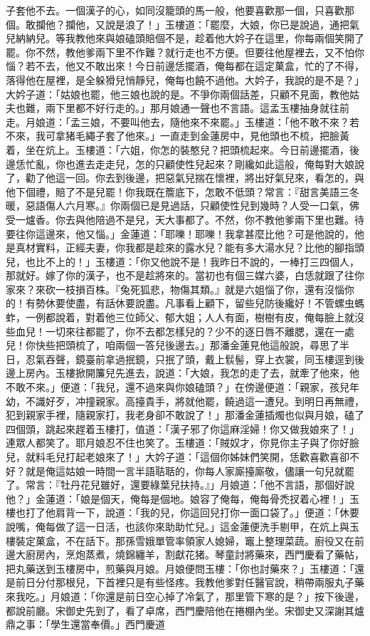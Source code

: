 \begin{showcontents}{}
子套他不去。一個漢子的心，如同沒籠頭的馬一般，他要喜歡那一個，只喜歡那個。敢攔他？攔他，又說是浪了！」玉樓道：「罷麼，大娘，你已是說過，通把氣兒納納兒。等我教他來與娘磕頭賠個不是，趁着他大妗子在這里，你每兩個笑開了罷。你不然，教他爹兩下里不作難？就行走也不方便。但要往他屋裡去，又不怕你惱？若不去，他又不敢出來！今日前邊恁擺酒，俺每都在這定菓盒，忙的了不得，落得他在屋裡，是全躲猾兒悄靜兒，俺每也饒不過他。大妗子，我說的是不是？」大妗子道：「姑娘也罷，他三娘也說的是。不爭你兩個話差，只顧不見面，教他姑夫也難，兩下里都不好行走的。」那月娘通一聲也不言語。這孟玉樓抽身就往前走。月娘道：「孟三娘，不要叫他去，隨他來不來罷。」玉樓道：「他不敢不來？若不來，我可拿猪毛繩子套了他來。」一直走到金蓮房中，見他頭也不梳，把臉黃着，坐在炕上。玉樓道：「六姐，你怎的裝憨兒？把頭梳起來。今日前邊擺酒，後邊恁忙亂，你也進去走走兒，怎的只顧使性兒起來？剛纔如此這般，俺每對大娘說了，勸了他這一回。你去到後邊，把惡氣兒揣在懷裡，將出好氣兒來，看怎的，與他下個禮，賠了不是兒罷！你我既在簷底下，怎敢不低頭？常言：『甜言美語三冬暖，惡語傷人六月寒。』你兩個已是見過話，只顧使性兒到幾時？人受一口氣，佛受一爐香。你去與他陪過不是兒，天大事都了。不然，你不教他爹兩下里也難。待要往你這邊來，他又惱。」金蓮道：「耶嚛！耶嚛！我拿甚麼比他？可是他說的，他是真材實料，正經夫妻，你我都是趁來的露水兒？能有多大湯水兒？比他的腳指頭兒，也比不上的！」玉樓道：「你又他說不是！我昨日不說的，一棒打三四個人，那就好。嫁了你的漢子，也不是趁將來的。當初也有個三媒六婆，白恁就跟了往你家來？來砍一枝損百株。『兔死狐悲，物傷其類。』就是六姐惱了你，還有沒惱你的！有勢休要使盡，有話休要說盡。凡事看上顧下，留些兒防後纔好！不管螺虫螞蚱，一例都說着，對着他三位師父、郁大姐；人人有面，樹樹有皮，俺每臉上就沒些血兒！一切來往都罷了，你不去都怎樣兒的？少不的逐日唇不離腮，還在一處兒！你快些把頭梳了，咱兩個一答兒後邊去。」那潘金蓮見他這般說，尋思了半日，忍氣吞聲，鏡臺前拿過抿鏡，只抿了頭，戴上䯼髻，穿上衣裳，同玉樓逕到後邊上房內。玉樓掀開簾兒先進去，說道：「大娘，我怎的走了去，就牽了他來，他不敢不來。」便道：「我兒，還不過來與你娘磕頭？」在傍邊便道：「親家，孩兒年幼，不識好歹，冲撞親家。高擡貴手，將就他罷，饒過這一遭兒。到明日再無禮，犯到親家手裡，隨親家打，我老身卻不敢說了！」那潘金蓮插燭也似與月娘，磕了四個頭，跳起來趕着玉樓打，值道：「漢子邪了你這麻淫婦！你又做我娘來了！」連眾人都笑了。耶月娘忍不住也笑了。玉樓道：「賊奴才，你見你主子與了你好臉兒，就料毛兒打起老娘來了！」大妗子道：「這個你姊妹們笑開，恁歡喜歡喜卻不好？就是俺這姑娘一時間一言半語聐聒的，你每人家廝擡廝敬，儘讓一句兒就罷了。常言：『牡丹花兒雖好，還要綠葉兒扶持。』」月娘道：「他不言語，那個好說他？」金蓮道：「娘是個天，俺每是個地。娘容了俺每，俺每骨禿扠着心裡！」玉樓也打了他肩背一下，說道：「我的兒，你這回兒打你一面口袋了。」便道：「休要說嘴，俺每做了這一日活，也該你來助助忙兒。」這金蓮便洗手剔甲，在炕上與玉樓裝定菓盒，不在話下。那孫雪娥單管率領家人媳婦，竈上整理菜蔬。廚役又在前邊大廚房內，烹炮蒸煮，燒錦纏羊，割獻花猪。琴童討將藥來，西門慶看了藥帖，把丸藥送到玉樓房中，煎藥與月娘。月娘便問玉樓：「你也討藥來？」玉樓道：「還是前日分付那根兒，下首裡只是有些怪疼。我教他爹對任醫官說，稍帶兩服丸子藥來我吃。」月娘道：「你還是前日空心掉了冷氣了，那里管下寒的是？」按下後邊，都說前廳。宋御史先到了，看了卓席，西門慶陪他在捲棚內坐。宋御史又深謝其爐鼎之事：「學生還當奉價。」西門慶道
\end{showcontents}
